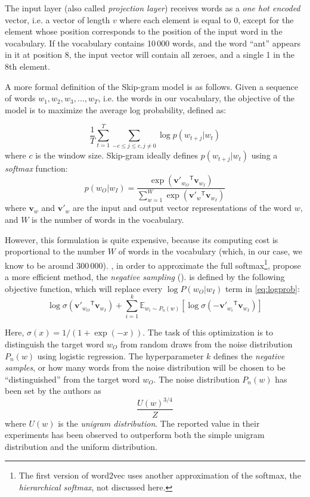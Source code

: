 The input layer (also called \emph{projection layer}) receives words as a \emph{one hot encoded} vector, i.e. a vector of length $v$ where each element is equal to 0, except for the element whose position corresponds to the position of the input word in the vocabulary. If the vocabulary contains 10\,000 words, and the word ``ant'' appears in it at position 8, the input vector will contain all zeroes, and a single 1 in the 8th element.

A more formal definition of the Skip-gram model is as follows. Given a sequence of words $w_1, w_2, w_3, \dots, w_T$, i.e. the words in our vocabulary, the objective of the model is to maximize the average log probability, defined as:

\begin{equation} \label{eq:logprob}
\frac{1}{T} \sum\limits_{t=1}^{T}
\sum\limits_{-c \leq j \leq c, j \neq 0}
\log p(w_{t+j}|w_t)
\end{equation}
where $c$ is the window size. Skip-gram ideally defines $p(w_{t+j}|w_t)$ using a \emph{softmax} function:
\begin{equation} \label{eq:softmax}
p(w_O|w_I) = 
\frac
{\exp\left({\mathbf{v}'}_{w_O} {}^\mathsf{T} \mathbf{v}_{w_I}\right)}
{\sum\limits_{w=1}^{W}\exp\left({\mathbf{v}'}_w {}^\mathsf{T} \mathbf{v}_{w_I}\right)}
\end{equation}
where $\mathbf{v}_w$ and $\mathbf{v}'_w$ are the input and output vector representations of the word $w$, and $W$ is the number of words in the vocabulary.

However, this formulation is quite expensive, because its computing cost is proportional to the number $W$ of words in the vocabulary (which, in our case, we know to be around 300\,000). \citeauthor{mikolov2013efficient}, in order to approximate the full softmax\footnote{The first version of word2vec uses another approximation of the softmax, the \emph{hierarchical softmax}, not discussed here.}, propose a more efficient method, the \emph{negative sampling} ().  is defined by the following objective function, which will replace every $\log P(w_O|w_I)$ term in \autoref{eq:logprob}:
\begin{equation} \label{eq:negsamp}
\log \sigma\left(\mathbf{v}'_{w_O} {}^\mathsf{T} \mathbf{v}_{w_I}\right) +
\sum\limits_{i=1}^k \mathbb{E}_{w_i \sim P_n(w)}
\left[\log \sigma\left(-\mathbf{v}'_{w_i} {}^\mathsf{T} \mathbf{v}_{w_I}\right)\right]
\end{equation}

Here, $\sigma(x) = 1 / (1 + \exp(-x))$. The task of this optimization is to distinguish the target word $w_O$ from random draws from the noise distribution $P_n(w)$ using logistic regression. The hyperparameter $k$ defines the \emph{negative samples}, or how many words from the noise distribution will be chosen to be ``distinguished'' from the target word $w_O$. The noise distribution $P_n(w)$ has been set by the authors as
$$
\frac{U(w)^{3/4}}{Z}
$$
where $U(w)$ is the \emph{unigram distribution}. The reported value in their experiments has been observed to outperform both the simple unigram distribution and the uniform distribution.


